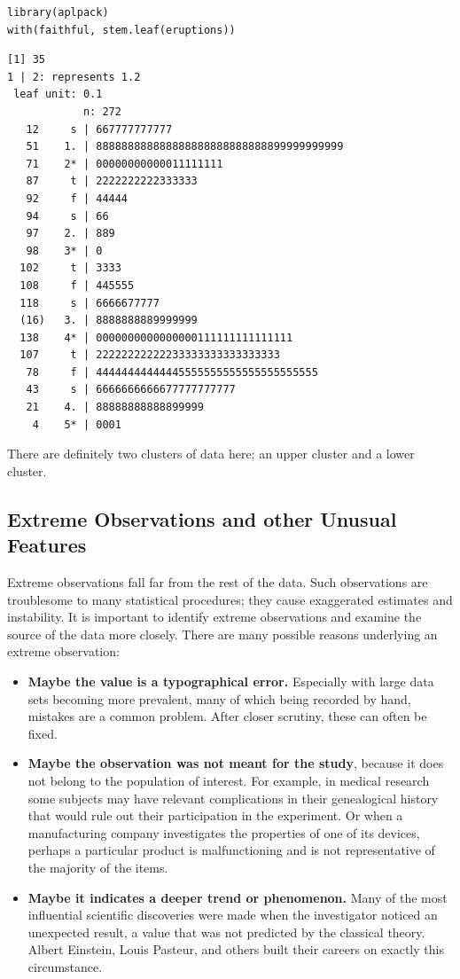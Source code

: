 \documentclass[captions=tableheading]{scrbook}
\begin{document}
\begin{verbatim}
library(aplpack)
with(faithful, stem.leaf(eruptions))
\end{verbatim}


\begin{verbatim}
[1] 35
1 | 2: represents 1.2
 leaf unit: 0.1
            n: 272
   12     s | 667777777777
   51    1. | 888888888888888888888888888899999999999
   71    2* | 00000000000011111111
   87     t | 2222222222333333
   92     f | 44444
   94     s | 66
   97    2. | 889
   98    3* | 0
  102     t | 3333
  108     f | 445555
  118     s | 6666677777
  (16)   3. | 8888888889999999
  138    4* | 0000000000000000111111111111111
  107     t | 22222222222233333333333333333
   78     f | 44444444444445555555555555555555555
   43     s | 6666666666677777777777
   21    4. | 88888888888899999
    4    5* | 0001
\end{verbatim}

There are definitely two clusters of data here; an upper cluster and a lower cluster. 
\subsection{Extreme Observations and other Unusual Features}
\label{sec-2-2-5}
\label{sub:Extreme-Observations-and}


Extreme observations fall far from the rest of the data. Such observations are troublesome to many statistical procedures; they cause exaggerated estimates and instability. It is important to identify extreme observations and examine the source of the data more closely. There are many possible reasons underlying an extreme observation:

\begin{itemize}
\item \textbf{Maybe the value is a typographical error.} Especially with large data sets becoming more prevalent, many of which being recorded by hand, mistakes are a common problem. After closer scrutiny, these can often be fixed.
\item \textbf{Maybe the observation was not meant for the study}, because it does not belong to the population of interest. For example, in medical research some subjects may have relevant complications in their genealogical history that would rule out their participation in the experiment. Or when a manufacturing company investigates the properties of one of its devices, perhaps a particular product is malfunctioning and is not representative of the majority of the items.
\item \textbf{Maybe it indicates a deeper trend or phenomenon.} Many of the most influential scientific discoveries were made when the investigator noticed an unexpected result, a value that was not predicted by the classical theory. Albert Einstein, Louis Pasteur, and others built their careers on exactly this circumstance.
\end{itemize}
\end{document}
